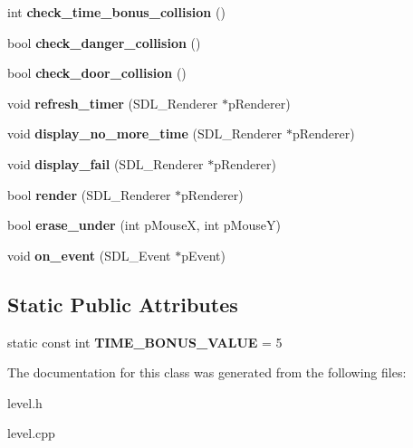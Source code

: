 \begin{DoxyCompactItemize}
int {\bfseries check\+\_\+time\+\_\+bonus\+\_\+collision} ()
\item 
\mbox{\label{classLevel_a11750e96ec56e65da24ff048fe1f042a}} 
bool {\bfseries check\+\_\+danger\+\_\+collision} ()
\item 
\mbox{\label{classLevel_a491da71cc66572cdf4159905deafa42c}} 
bool {\bfseries check\+\_\+door\+\_\+collision} ()
\item 
\mbox{\label{classLevel_af02b5497776c1f902fc0f3698c604dcc}} 
void {\bfseries refresh\+\_\+timer} (S\+D\+L\+\_\+\+Renderer $\ast$p\+Renderer)
\item 
\mbox{\label{classLevel_a17d6c2af41e51f5ff72198d5371a3d57}} 
void {\bfseries display\+\_\+no\+\_\+more\+\_\+time} (S\+D\+L\+\_\+\+Renderer $\ast$p\+Renderer)
\item 
\mbox{\label{classLevel_a9f5d9876ea1b0eeba73456b99765b1bc}} 
void {\bfseries display\+\_\+fail} (S\+D\+L\+\_\+\+Renderer $\ast$p\+Renderer)
\item 
\mbox{\label{classLevel_ab3e7c471f536e5fdda9a244f4b3bad7e}} 
bool {\bfseries render} (S\+D\+L\+\_\+\+Renderer $\ast$p\+Renderer)
\item 
\mbox{\label{classLevel_a308f7d615b892cda258f6bd0f6bd977d}} 
bool {\bfseries erase\+\_\+under} (int p\+MouseX, int p\+MouseY)
\item 
\mbox{\label{classLevel_aeacdcecb050f8311ec736bdf08a1d915}} 
void {\bfseries on\+\_\+event} (S\+D\+L\+\_\+\+Event $\ast$p\+Event)
\end{DoxyCompactItemize}
\subsection*{Static Public Attributes}
\begin{DoxyCompactItemize}
\item 
\mbox{\label{classLevel_abffde6b564b709be1d0ed4c61289af4b}} 
static const int {\bfseries T\+I\+M\+E\+\_\+\+B\+O\+N\+U\+S\+\_\+\+V\+A\+L\+UE} = 5
\end{DoxyCompactItemize}


The documentation for this class was generated from the following files\+:\begin{DoxyCompactItemize}
\item 
level.\+h\item 
level.\+cpp\end{DoxyCompactItemize}
